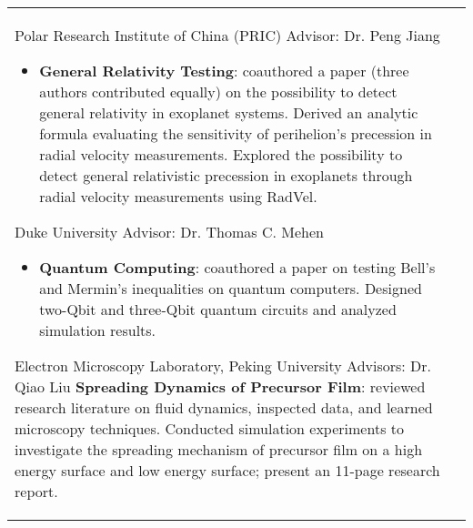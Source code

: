 \documentclass[10pt]{article} %
\begin{document}
\begin{supertabular}{L{4cm}@{\hskip 0.3in}L{13cm}}
{Polar Research Institute of China (PRIC)} %
{Advisor: Dr. Peng Jiang} %
{\begin{itemize}
\vspace{-0.4cm}
    \item \textbf{General Relativity Testing}: coauthored a paper (three authors contributed equally) on the possibility to detect general relativity in exoplanet systems. Derived an analytic formula evaluating the sensitivity of perihelion’s precession in radial velocity measurements. Explored the possibility to detect general relativistic precession in exoplanets through radial velocity measurements using RadVel.
\end{itemize}}
 



{Duke University} %
{Advisor: Dr. Thomas C. Mehen} %
{\begin{itemize}
\vspace{-0.4cm}
 \item \textbf{Quantum Computing}: coauthored a paper on testing  Bell's and Mermin's inequalities on quantum computers. Designed two-Qbit and three-Qbit quantum circuits and analyzed simulation results.
 \end{itemize}}  %


{Electron Microscopy Laboratory, Peking University} %
{Advisors: Dr. Qiao Liu} %
{\textbf{Spreading Dynamics of Precursor Film}: reviewed research literature on fluid dynamics, inspected data, and learned microscopy techniques. Conducted simulation experiments to investigate the spreading mechanism of precursor film on a high energy surface and low energy surface; present an 11-page research report.} %

\end{supertabular}
\end{document}

